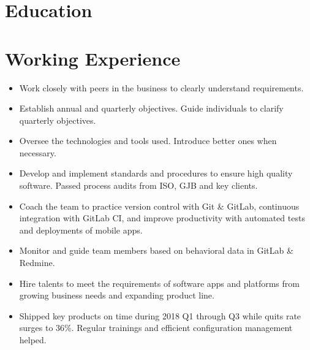 \documentclass[11pt,a4paper]{moderncv/moderncv}
\begin{document}
\maketitle



\section{Education}

\section{Working Experience}

{
\begin{itemize}
	\item Work closely with peers in the business to clearly understand requirements.
	\item Establish annual and quarterly objectives. Guide individuals to clarify quarterly objectives.
	\item Oversee the technologies and tools used. Introduce better ones when necessary.
	\item Develop and implement standards and procedures to ensure high quality software. Passed process audits from ISO, GJB and key clients.
	\item Coach the team to practice version control with Git \& GitLab, continuous integration with GitLab CI, and improve productivity with automated tests and deployments of mobile apps.
	\item Monitor and guide team members based on behavioral data in GitLab \& Redmine.
	\item Hire talents to meet the requirements of software apps and platforms from growing business needs and expanding product line.
	\item Shipped key products on time during 2018 Q1 through Q3 while quits rate surges to 36\%. Regular trainings and efficient configuration management helped.
\end{itemize}
}
\end{document}

